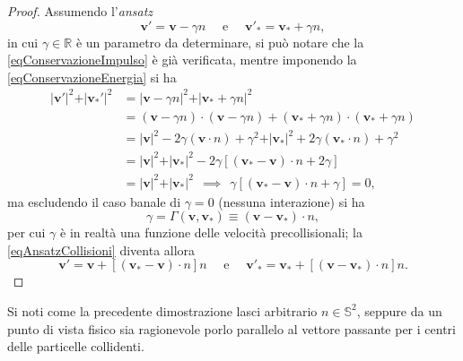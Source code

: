                 \begin{proof}
                    Assumendo l'\textit{ansatz}
                    \begin{equation}
                        \label{eqAnsatzCollisioni}
                        \mathbf v'=\mathbf v-\gamma n\quad\text{ e }\quad\mathbf v'_*=\mathbf v_*+\gamma n,
                    \end{equation}
                    in cui \(\gamma\in\mathbb R\) è un parametro da determinare, si può notare che la \eqref{eqConservazioneImpulso} è già verificata, mentre imponendo la \eqref{eqConservazioneEnergia} si ha
                    \[
                        \begin{aligned}
                            \vert\mathbf v'\vert^2+\vert\mathbf v_*'\vert^2
                            &=\vert\mathbf v-\gamma n\vert^2+\vert\mathbf v_*+\gamma n\vert^2\\
                            &=(\mathbf v-\gamma n)\cdot(\mathbf v-\gamma n)
                            +(\mathbf v_*+\gamma n)\cdot(\mathbf v_*+\gamma n)\\
                            &=\vert\mathbf v\vert^2-2\gamma(\mathbf v\cdot n)
                            +\gamma^2+\vert\mathbf v_*\vert^2
                            +2\gamma(\mathbf v_*\cdot n)+\gamma^2\\
                            &=\vert\mathbf v\vert^2+\vert\mathbf v_*\vert^2
                            -2\gamma[(\mathbf v_*-\mathbf v)\cdot n+2\gamma]\\
                            &=\vert\mathbf v\vert^2+\vert\mathbf v_*\vert^2
                            \ \ \implies\ \ 
                            \gamma[(\mathbf v_*-\mathbf v)\cdot n+\gamma]=0,
                        \end{aligned}
                    \]
                    ma escludendo il caso banale di \(\gamma=0\) (nessuna interazione) si ha
                    \[
                        \gamma=\Gamma(\mathbf v,\mathbf v_*)\equiv(\mathbf v-\mathbf v_*)\cdot n,
                    \]
                    per cui \(\gamma\) è in realtà una funzione delle velocità precollisionali; la \eqref{eqAnsatzCollisioni} diventa allora
                    \begin{equation}
                        \label{eqVelocitàPoscollisionali}
                        \mathbf v'=\mathbf v+[(\mathbf v_*-\mathbf v)\cdot n]n
                        \quad\text{ e }\quad\mathbf v'_*
                        =\mathbf v_*+[(\mathbf v-\mathbf v_*)\cdot n]n.
                    \end{equation}
                \end{proof}
                Si noti come la precedente dimostrazione lasci arbitrario \(n\in\mathbb S^2\), seppure da un punto di vista fisico sia ragionevole porlo parallelo al vettore passante per i centri delle particelle collidenti.


